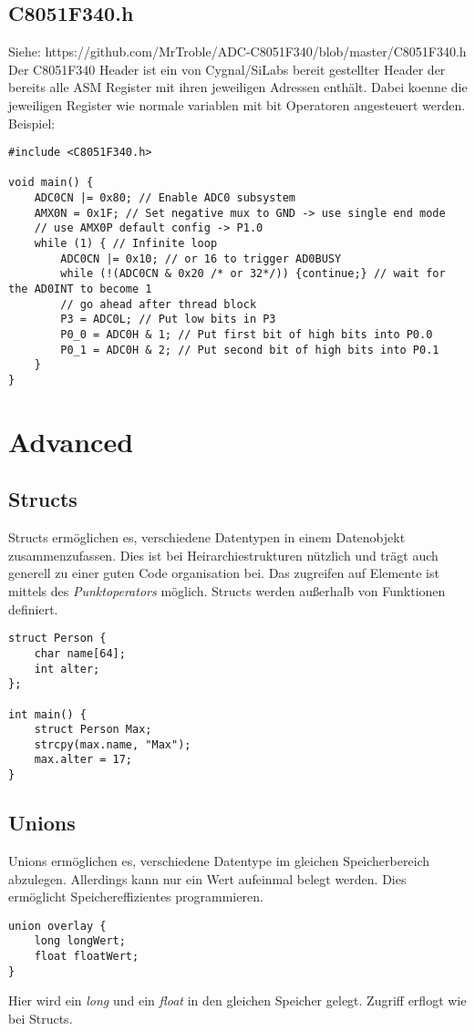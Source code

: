 \documentclass{article}
\begin{document}
\newpage
\subsection{C8051F340.h}
Siehe: https://github.com/MrTroble/ADC-C8051F340/blob/master/C8051F340.h
\newline\newline
Der C8051F340 Header ist ein von Cygnal/SiLabs bereit gestellter Header der bereits alle ASM Register mit ihren jeweiligen Adressen enthält. Dabei koenne die jeweiligen Register wie normale variablen mit bit Operatoren angesteuert werden. Beispiel:
\begin{verbatim}
#include <C8051F340.h>

void main() {
    ADC0CN |= 0x80; // Enable ADC0 subsystem
    AMX0N = 0x1F; // Set negative mux to GND -> use single end mode
    // use AMX0P default config -> P1.0
    while (1) { // Infinite loop
        ADC0CN |= 0x10; // or 16 to trigger AD0BUSY
        while (!(ADC0CN & 0x20 /* or 32*/)) {continue;} // wait for the AD0INT to become 1
        // go ahead after thread block
        P3 = ADC0L; // Put low bits in P3
        P0_0 = ADC0H & 1; // Put first bit of high bits into P0.0
        P0_1 = ADC0H & 2; // Put second bit of high bits into P0.1
    }
}
\end{verbatim}

\section{Advanced}

\subsection{Structs}

Structs ermöglichen es, verschiedene Datentypen in einem Datenobjekt zusammenzufassen. Dies ist bei Heirarchiestrukturen nützlich und trägt auch generell zu einer guten Code organisation bei. Das zugreifen auf Elemente ist mittels des \textit{Punktoperators} möglich.
Structs werden außerhalb von Funktionen definiert.
\begin{verbatim}
struct Person {
    char name[64];
    int alter;
};

int main() {
    struct Person Max;
    strcpy(max.name, "Max");
    max.alter = 17;
}
\end{verbatim}

\subsection{Unions}
Unions ermöglichen es, verschiedene Datentype im gleichen Speicherbereich abzulegen. Allerdings kann nur ein Wert aufeinmal belegt werden. Dies ermöglicht Speichereffizientes programmieren.
\begin{verbatim}
union overlay {
    long longWert;
    float floatWert;
}
\end{verbatim}
Hier wird ein \textit{long} und ein \textit{float} in den gleichen Speicher gelegt. Zugriff erflogt wie bei Structs.
\end{document}
